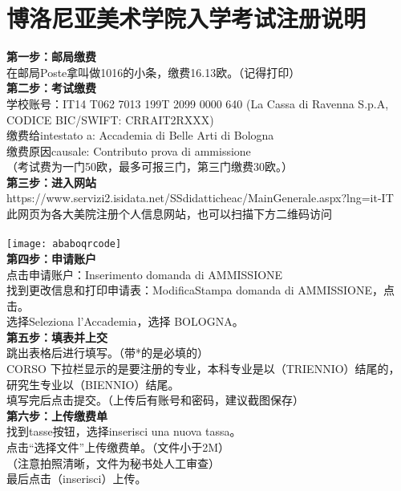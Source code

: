 \section{博洛尼亚美术学院入学考试注册说明}
\textbf{第一步：邮局缴费}\\
在邮局Poste拿叫做1016的小条，缴费16.13欧。（记得打印）\\

\textbf{第二步：考试缴费}\\
学校账号：IT14 T062 7013 199T 2099 0000 640  (La Cassa di Ravenna S.p.A, CODICE BIC/SWIFT: CRRAIT2RXXX)\\
缴费给intestato a: Accademia di Belle Arti di Bologna \\
缴费原因causale: Contributo prova di ammissione\\
（考试费为一门50欧，最多可报三门，第三门缴费30欧。）\\

\textbf{第三步：进入网站}\\
https://www.servizi2.isidata.net/SSdidatticheac/MainGenerale.aspx?lng=it-IT\\
此网页为各大美院注册个人信息网站，也可以扫描下方二维码访问\\
\\
\texttt{[image: ababoqrcode]}\\


\textbf{第四步：申请账户}\\
点击申请账户：Inserimento domanda di AMMISSIONE\\
找到更改信息和打印申请表：ModificaStampa domanda di AMMISSIONE，点击。\\
选择Seleziona l’Accademia，选择 BOLOGNA。\\

\textbf{第五步：填表并上交}\\
跳出表格后进行填写。（带*的是必填的）\\
CORSO 下拉栏显示的是要注册的专业，本科专业是以（TRIENNIO）结尾的，研究生专业以（BIENNIO）结尾。\\
填写完后点击提交。（上传后有账号和密码，建议截图保存）\\

\textbf{第六步：上传缴费单}\\
找到tasse按钮，选择inserisci una nuova tassa。\\
点击“选择文件”上传缴费单。（文件小于2M）\\
（注意拍照清晰，文件为秘书处人工审查）\\
最后点击（inserisci）上传。\\

